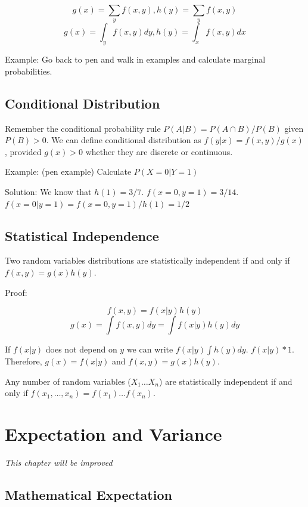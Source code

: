\documentclass[]{book}
\theoremstyle{definition}
\theoremstyle{definition}
\theoremstyle{definition}
\theoremstyle{remark}
\begin{document}
\[g(x) = \sum_y f(x,y), h(y) = \sum_y f(x,y)\]
\[g(x) = \int_y f(x,y) dy, h(y) = \int_x f(x,y) dx\]

Example: Go back to pen and walk in examples and calculate marginal
probabilities.

\hypertarget{conditional-distribution}{%
\section{Conditional Distribution}\label{conditional-distribution}}

Remember the conditional probability rule \(P(A|B) = P(A \cap B)/P(B)\)
given \(P(B) > 0\). We can define conditional distribution as
\(f(y|x) = f(x,y)/g(x)\), provided \(g(x) > 0\) whether they are
discrete or continuous.

Example: (pen example) Calculate \(P(X=0|Y=1)\)

Solution: We know that \(h(1) = 3/7\). \(f(x=0,y=1) = 3/14\).
\(f(x=0|y=1) = f(x=0,y=1)/h(1) = 1/2\)

\hypertarget{statistical-independence}{%
\section{Statistical Independence}\label{statistical-independence}}

Two random variables distributions are statistically independent if and
only if \(f(x,y) = g(x)h(y)\).

Proof:

\[f(x,y) = f(x|y)h(y)\] \[g(x) = \int f(x,y)dy = \int f(x|y)h(y) dy \]

If \(f(x|y)\) does not depend on \(y\) we can write
\(f(x|y) \int h(y) dy\). \(f(x|y)*1\). Therefore, \(g(x)=f(x|y)\) and
\(f(x,y) = g(x)h(y)\).

Any number of random variables (\(X_1 \dots X_n\)) are statistically
independent if and only if \(f(x_1,\dots,x_n) = f(x_1)\dots f(x_n)\).

\hypertarget{expectation-and-variance}{%
\chapter{Expectation and Variance}\label{expectation-and-variance}}

\emph{This chapter will be improved}

\hypertarget{mathematical-expectation}{%
\section{Mathematical Expectation}\label{mathematical-expectation}}
\end{document}
